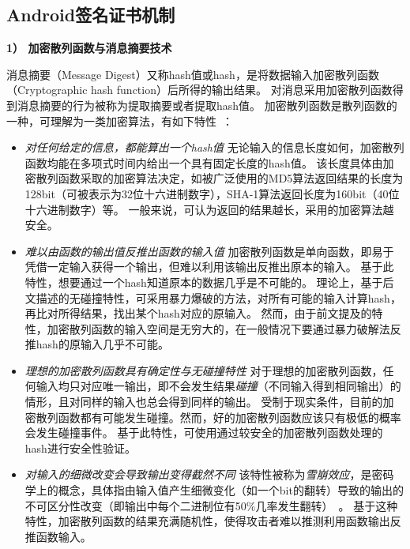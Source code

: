 \subsection{Android签名证书机制}
\label{sec:signature}

\textbf{1） 加密散列函数与消息摘要技术}

消息摘要（Message Digest）又称hash值或hash，是将数据输入加密散列函数（Cryptographic hash function）后所得的输出结果。
对消息采用加密散列函数得到消息摘要的行为被称为提取摘要或者提取hash值。
加密散列函数是散列函数的一种，可理解为一类加密算法，有如下特性~\cite{wiki_encryptographic}：
\begin{itemize}
	\setlength{\itemsep}{1pt}
	      \setlength{\parskip}{0pt}
	      \setlength{\parsep}{0pt}
	\item \emph{对任何给定的信息，都能算出一个hash值} \quad
	      无论输入的信息长度如何，加密散列函数均能在多项式时间内给出一个具有固定长度的hash值。
	      该长度具体由加密散列函数采取的加密算法决定，如被广泛使用的MD5算法返回结果的长度为128bit（可被表示为32位十六进制数字），SHA-1算法返回长度为160bit（40位十六进制数字）等。
	      一般来说，可认为返回的结果越长，采用的加密算法越安全。

	\item \emph{难以由函数的输出值反推出函数的输入值} \quad
	      加密散列函数是单向函数，即易于凭借一定输入获得一个输出，但难以利用该输出反推出原本的输入。
	      基于此特性，想要通过一个hash知道原本的数据几乎是不可能的。
	      理论上，基于后文描述的无碰撞特性，可采用暴力爆破的方法，对所有可能的输入计算hash，再比对所得结果，找出某个hash对应的原输入。
	      然而，由于前文提及的特性，加密散列函数的输入空间是无穷大的，在一般情况下要通过暴力破解法反推hash的原输入几乎不可能。

	\item \emph{理想的加密散列函数具有确定性与无碰撞特性} \quad
	      对于理想的加密散列函数，任何输入均只对应唯一输出，即不会发生结果\textit{碰撞}（不同输入得到相同输出）的情形，且对同样的输入也总会得到同样的输出。
	      受制于现实条件，目前的加密散列函数都有可能发生碰撞。然而，好的加密散列函数应该只有极低的概率会发生碰撞事件。
	      基于此特性，可使用通过较安全的加密散列函数处理的hash进行安全性验证。

	\item \emph{对输入的细微改变会导致输出变得截然不同} \quad
	      该特性被称为\textit{雪崩效应}，是密码学上的概念，具体指由输入值产生细微变化（如一个bit的翻转）导致的输出的不可区分性改变（即输出中每个二进制位有50\%几率发生翻转）~\cite{feistel1973cryptography}。
	      基于这种特性，加密散列函数的结果充满随机性，使得攻击者难以推测利用函数输出反推函数输入。
\end{itemize}

